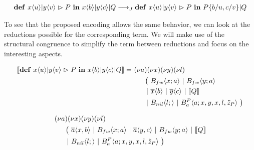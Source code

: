 \begin{align*}
  \textbf{\textup{def}} \ x\langle u\rangle | y\langle v\rangle \vartriangleright P \ \textbf{\textup{in}} \ x\langle b\rangle | y\langle c\rangle | Q
  \longrightarrow_J
  \textbf{\textup{def}} \ x\langle u\rangle | y\langle v\rangle \vartriangleright P \ \textbf{\textup{in}} \ P\{ b / u,c / v \} | Q
\end{align*}

To see that the proposed encoding allows the same behavior,
we can look at the reductions possible for the corresponding \actorpicalc term.
We will make use of the structural congruence to simplify the term between reductions
and focus on the interesting aspects.

\begin{align*}
  \encMJtoAP{\jdef{\jrct{\jrcv{x}{u} \jpat \jrcv{y}{v}}{P}}{\jsnd{x}{b} \jpar \jsnd{y}{c} \jpar Q}}
  =\ &\anew{a}{\anew{x}{\anew{y}{\anew{l}{ \\
      &\hspace{0.5cm}
      \begin{aligned}[t]
        \big(\ &\ains{B_{fw}}{x}{a}
        \apar   \ains{B_{fw}}{y}{a} \\
        \apar  &\asnd{x}{b} \apar \asnd{y}{c} \apar \encMJtoAP{Q} \\
        \apar  &\ains{B_{nil}}{l}{}
        \apar   \ains{B_a^P}{a}{x, y, x, l, \tilde{z}_P}
        \ \big)
      \end{aligned}
    }}}}
\end{align*}


\begin{align*}
  &\anew{a}{\anew{x}{\anew{y}{\anew{l}{ \\
    &\hspace{0.5cm}
    \begin{aligned}[t]
      \big(\ &\asnd{a}{x,b}
      \apar   \ains{B_{fw}}{x}{a}
      \apar   \asnd{a}{y,c}
      \apar   \ains{B_{fw}}{y}{a}
      \apar   \encMJtoAP{Q} \\
      \apar  &\ains{B_{nil}}{l}{}
      \apar   \ains{B_a^P}{a}{x, y, x, l, \tilde{z}_P}
      \ \big)
    \end{aligned}
  }}}}
\end{align*}


